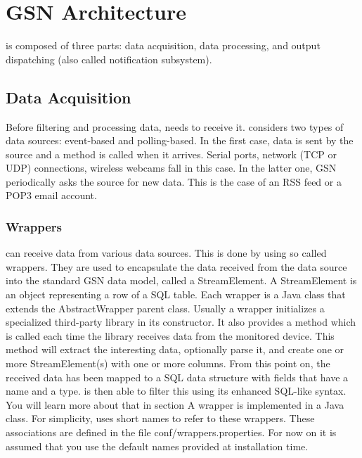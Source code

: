 \graphicspath{{chapters/ch-architecture/figures/}}

\chapter{GSN Architecture}

\gsn is composed of three parts: data acquisition, data processing, and output
dispatching (also called notification subsystem).

\section{Data Acquisition}

Before filtering and processing data, \gsn needs to receive it. \gsn considers two types of data sources: event-based and polling-based.
In the first case, data is sent by the source and a \gsn method is called when it arrives.
Serial ports, network (TCP or UDP) connections, wireless webcams fall in this case. In the latter one, GSN periodically asks the 
source for new data. This is the case of an RSS feed or a POP3 email account.

\subsection{\gsn Wrappers \label{gsn_wrappers}}

\gsn can receive data from various data sources. This is done by using so called
wrappers. They are used to encapsulate the data received from the data source
into the standard GSN data model, called a StreamElement. A StreamElement
is an object representing a row of a SQL table.
Each wrapper is a Java class that extends the AbstractWrapper parent class.
Usually a wrapper initializes a specialized third-party library in its constructor.
It also provides a method which is called each time the library receives data from
the monitored device. This method will extract the interesting data, optionally
parse it, and create one or more StreamElement(s) with one or more columns.
From this point on, the received data has been mapped to a SQL data structure
with fields that have a name and a type. \gsn is then able to filter this using
its enhanced SQL-like syntax. You will learn more about that in section 
A wrapper is implemented in a Java class. For simplicity, \gsn uses short
names to refer to these wrappers. These associations are defined in the file
conf/wrappers.properties. For now on it is assumed that you use the default
names provided at installation time.

